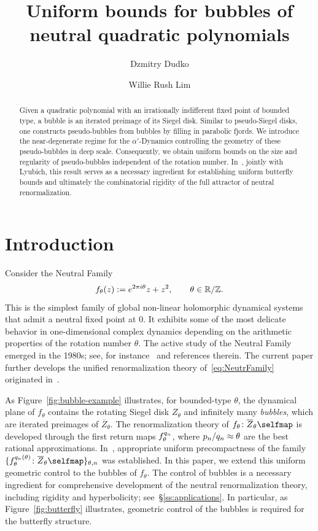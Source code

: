 \documentclass{amsart}
\title[Uniform bounds for bubbles]{Uniform bounds for bubbles of neutral quadratic polynomials}
\author{Dzmitry Dudko}
\author{Willie Rush Lim}
\date{}
\begin{document}
\begin{abstract}
    Given a quadratic polynomial with an irrationally indifferent fixed point of bounded type, a bubble is an iterated preimage of its Siegel disk. 
    Similar to pseudo-Siegel disks, one constructs pseudo-bubbles from bubbles by filling in parabolic fjords. We introduce the near-degenerate regime for the $\alpha'$-Dynamics controlling the geometry of these pseudo-bubbles in deep scale. Consequently, we obtain uniform bounds on the size and regularity of pseudo-bubbles independent of the rotation number. In~\cite{DLL}, jointly with Lyubich, this result serves as a necessary ingredient for establishing uniform butterfly bounds and ultimately the combinatorial rigidity of the full attractor of neutral renormalization. 
   
\end{abstract}

\maketitle

\setcounter{tocdepth}{1}
\tableofcontents

\section{Introduction}
\label{sec:intro}

Consider the Neutral Family
\begin{equation}
    \label{eq:NeutrFamily}
    f_\theta(z) := e^{2\pi i \theta} z + z^2, \qquad \theta \in \mathbb{R}/\mathbb{Z}.
\end{equation}
This is the simplest family of global non-linear holomorphic dynamical systems that admit a neutral fixed point at $0$.
It exhibits some of the most delicate behavior in one-dimensional complex dynamics depending on the arithmetic properties of the rotation number $\theta$. The active study of the Neutral Family emerged in the 1980s; see, for instance~\cite{D87, McM98, Shi98, PZ04, IS, DLS, SY24, Che25} and references therein. The current paper further develops the unified renormalization theory of~\eqref{eq:NeutrFamily} originated in~\cite{DL22}.    

As Figure~\ref{fig:bubble-example} illustrates, for bounded-type $\theta$, the dynamical plane of $f_\theta$ contains the rotating Siegel disk $Z_\theta$ and infinitely many \emph{bubbles}, which are iterated preimages of $\overline Z_\theta$. The renormalization theory of $f_\theta\colon \overline Z_\theta\selfmap$ is developed through the first return maps $f^{q_n}_\theta$, where $p_n/q_n\approx \theta$ are the best rational approximations. In~\cite{DL22}, appropriate uniform precompactness of the family $\{f_\theta^{\qq_n(\theta)}\colon \overline Z_\theta\selfmap\}_{\theta,n }$ was established. In this paper, we extend this uniform geometric control to the bubbles of $f_\theta$. The control of bubbles is a necessary ingredient for comprehensive development of the neutral renormalization theory, including rigidity and hyperbolicity; see~\S\ref{ss:applications}. In particular, as Figure~\ref{fig:butterfly} illustrates, geometric control of the bubbles is required for the butterfly structure. 
\end{document}
